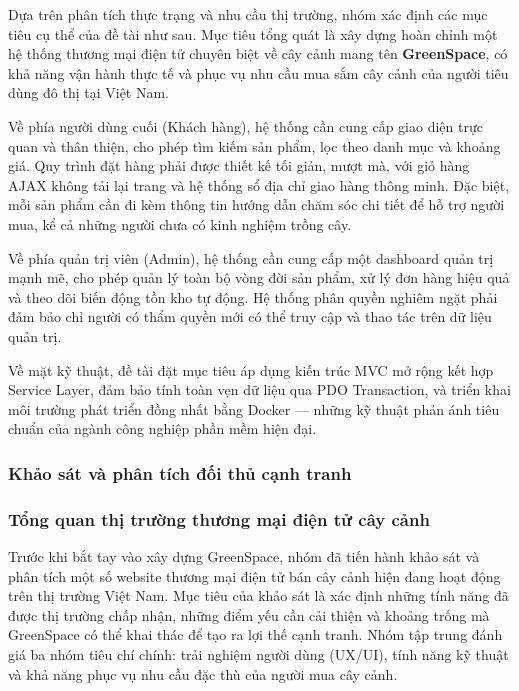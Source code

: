 \documentclass[11pt, a4paper]{article}
\begin{document}
Dựa trên phân tích thực trạng và nhu cầu thị trường, nhóm xác định các mục tiêu cụ thể của đề tài như sau. Mục tiêu tổng quát là xây dựng hoàn chỉnh một hệ thống thương mại điện tử chuyên biệt về cây cảnh mang tên \textbf{GreenSpace}, có khả năng vận hành thực tế và phục vụ nhu cầu mua sắm cây cảnh của người tiêu dùng đô thị tại Việt Nam.

Về phía người dùng cuối (Khách hàng), hệ thống cần cung cấp giao diện trực quan và thân thiện, cho phép tìm kiếm sản phẩm, lọc theo danh mục và khoảng giá. Quy trình đặt hàng phải được thiết kế tối giản, mượt mà, với giỏ hàng AJAX không tải lại trang và hệ thống sổ địa chỉ giao hàng thông minh. Đặc biệt, mỗi sản phẩm cần đi kèm thông tin hướng dẫn chăm sóc chi tiết để hỗ trợ người mua, kể cả những người chưa có kinh nghiệm trồng cây.

Về phía quản trị viên (Admin), hệ thống cần cung cấp một dashboard quản trị mạnh mẽ, cho phép quản lý toàn bộ vòng đời sản phẩm, xử lý đơn hàng hiệu quả và theo dõi biến động tồn kho tự động. Hệ thống phân quyền nghiêm ngặt phải đảm bảo chỉ người có thẩm quyền mới có thể truy cập và thao tác trên dữ liệu quản trị.

Về mặt kỹ thuật, đề tài đặt mục tiêu áp dụng kiến trúc MVC mở rộng kết hợp Service Layer, đảm bảo tính toàn vẹn dữ liệu qua PDO Transaction, và triển khai môi trường phát triển đồng nhất bằng Docker --- những kỹ thuật phản ánh tiêu chuẩn của ngành công nghiệp phần mềm hiện đại.

\subsubsection{Khảo sát và phân tích đối thủ cạnh tranh}

\subsubsection{Tổng quan thị trường thương mại điện tử cây cảnh}

Trước khi bắt tay vào xây dựng GreenSpace, nhóm đã tiến hành khảo sát và phân tích một số website thương mại điện tử bán cây cảnh hiện đang hoạt động trên thị trường Việt Nam. Mục tiêu của khảo sát là xác định những tính năng đã được thị trường chấp nhận, những điểm yếu cần cải thiện và khoảng trống mà GreenSpace có thể khai thác để tạo ra lợi thế cạnh tranh. Nhóm tập trung đánh giá ba nhóm tiêu chí chính: trải nghiệm người dùng (UX/UI), tính năng kỹ thuật và khả năng phục vụ nhu cầu đặc thù của người mua cây cảnh.
\end{document}
